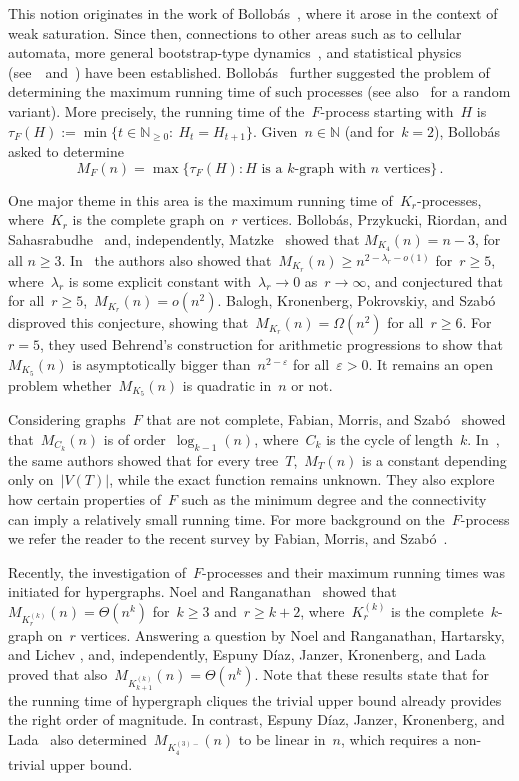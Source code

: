 \documentclass[oneside, 12pt]{amsart}
\numberwithin{equation}{section}
\numberwithin{figure}{section}
\let\epsilon=\varepsilon
\let\eps=\epsilon
\theoremstyle{plain}
\theoremstyle{note}
\theoremstyle{remark}
\begin{document}
    This notion originates in the work of Bollob\'as~\cite{B:68}, where it arose in the context of weak saturation.
    Since then, connections to other areas such as to cellular automata, more general bootstrap-type dynamics~\cite{M:17}, and statistical physics (see~\cite{BBM:12}~and~\cite{CLR:79}) have been established.
    Bollob\'as~\cite{BPRS:17} further suggested the problem of determining the maximum running time of such processes (see also~\cite{GKP:17} for a random variant).
    More precisely, the running time of the~$F$-process starting with~$H$ is~$\tau_F(H):=\min\{t\in\mathbb{N}_{\geq0}:\:H_t = H_{t + 1}\}$.
    Given~$n\in\mathds{N}$ (and for~$k=2$), Bollob\'as asked to determine
	\[
	M_F(n) = \max \big\{ \tau_F(H) : H \text{ is a } k\text{-graph with } n \text{ vertices} \big\}\,.
	\]
	
	One major theme in this area is the maximum running time of~$K_r$-processes, where~$K_r$ is the complete graph on~$r$ vertices. 
	Bollob\'as, Przykucki, Riordan, and Sahasrabudhe~\cite{BPRS:17} and, independently, Matzke~\cite{M:15} showed that $M_{K_4}(n)=n-3$, for all $n\ge 3$. 
	In~\cite{BPRS:17} the authors also showed that~$M_{K_r}(n)\ge n^{2-\lambda_r-o(1)}$ for~$r\ge 5$, where~$\lambda_r$ is some explicit constant with~$\lambda_r\rightarrow 0$ as~$r\rightarrow \infty$, and conjectured that for all~$r\ge 5$,~$M_{K_r}(n)=o(n^2)$. 
	Balogh, Kronenberg, Pokrovskiy, and Szab\'o~\cite{BKPS:19} disproved this conjecture, showing  that~$M_{K_r}(n)=\Omega(n^2)$ for all~$r\ge 6$. 
	For~$r=5$, they used Behrend's construction for arithmetic progressions to show that~$M_{K_5}(n)$ is asymptotically bigger than~$n^{2-\eps}$ for all~$\eps>0$.
    It remains an open problem whether~$M_{K_5}(n)$ is quadratic in~$n$ or not.
	
    Considering graphs~$F$ that are not complete, Fabian, Morris, and Szabó~\cite{FMS:23} showed that~$M_{C_k}(n)$ is of order~$\log_{k-1}(n)$, where~$C_k$ is the cycle of length~$k$.
    In~\cite{FMS:25}, the same authors showed that for every tree~$T$,~$M_T(n)$ is a constant depending only on~$\vert V(T)\vert$, while the exact function remains unknown.
	They also explore how certain properties of~$F$ such as the minimum degree and the connectivity can imply a relatively small running time. 
    For more background on the~$F$-process we refer the reader to the recent survey by Fabian, Morris, and Szab\'o~\cite{FMS:26}.
    
	Recently, the investigation of~$F$-processes and their maximum running times was initiated for hypergraphs.
    Noel and Ranganathan~\cite{NR:22} showed that~$M_{K^{(k)}_r}(n)=\Theta(n^k)$ for~$k\geq3$ and~$r\geq k+2$, where~$K^{(k)}_r$ is the complete~$k$-graph on~$r$ vertices.
    Answering a question by Noel and Ranganathan, Hartarsky, and Lichev \cite{HL:22}, and, independently, Espuny Díaz, Janzer, Kronenberg, and Lada \cite{EJKL:22} proved that also~$M_{K^{(k)}_{k+1}}(n)=\Theta(n^k)$.
    Note that these results state that for the running time of hypergraph cliques the trivial upper bound already provides the right order of magnitude.
	In contrast, Espuny Díaz, Janzer, Kronenberg, and Lada~\cite{EJKL:22} also determined~$M_{K^{(3)-}_4}(n)$ to be linear in~$n$, which requires a non-trivial upper bound.
\end{document}

